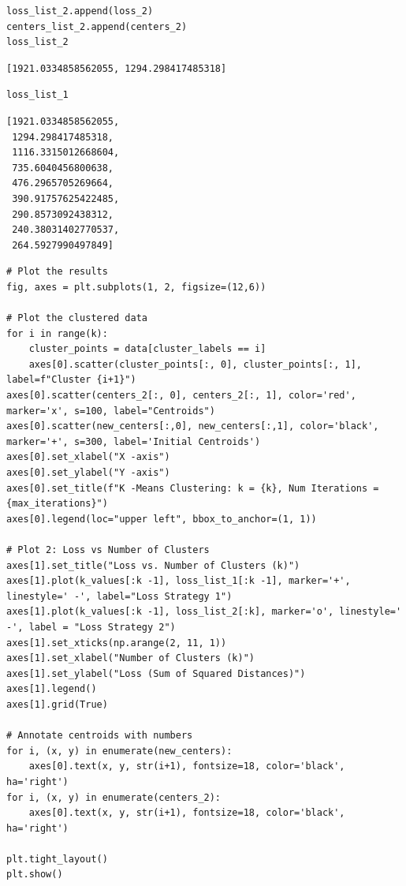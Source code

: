 \begin{verbatim}
loss_list_2.append(loss_2)
centers_list_2.append(centers_2)
loss_list_2
\end{verbatim}

\begin{verbatim}
[1921.0334858562055, 1294.298417485318]
\end{verbatim}

\begin{verbatim}
loss_list_1
\end{verbatim}

\begin{verbatim}
[1921.0334858562055,
 1294.298417485318,
 1116.3315012668604,
 735.6040456800638,
 476.2965705269664,
 390.91757625422485,
 290.8573092438312,
 240.38031402770537,
 264.5927990497849]
\end{verbatim}

\begin{verbatim}
# Plot the results
fig, axes = plt.subplots(1, 2, figsize=(12,6))

# Plot the clustered data
for i in range(k):
    cluster_points = data[cluster_labels == i]
    axes[0].scatter(cluster_points[:, 0], cluster_points[:, 1], label=f"Cluster {i+1}")
axes[0].scatter(centers_2[:, 0], centers_2[:, 1], color='red', marker='x', s=100, label="Centroids")
axes[0].scatter(new_centers[:,0], new_centers[:,1], color='black', marker='+', s=300, label='Initial Centroids')
axes[0].set_xlabel("X -axis")
axes[0].set_ylabel("Y -axis")
axes[0].set_title(f"K -Means Clustering: k = {k}, Num Iterations = {max_iterations}")
axes[0].legend(loc="upper left", bbox_to_anchor=(1, 1))

# Plot 2: Loss vs Number of Clusters
axes[1].set_title("Loss vs. Number of Clusters (k)")
axes[1].plot(k_values[:k -1], loss_list_1[:k -1], marker='+', linestyle=' -', label="Loss Strategy 1")
axes[1].plot(k_values[:k -1], loss_list_2[:k], marker='o', linestyle=' -', label = "Loss Strategy 2")
axes[1].set_xticks(np.arange(2, 11, 1))
axes[1].set_xlabel("Number of Clusters (k)")
axes[1].set_ylabel("Loss (Sum of Squared Distances)")
axes[1].legend()
axes[1].grid(True)

# Annotate centroids with numbers
for i, (x, y) in enumerate(new_centers):
    axes[0].text(x, y, str(i+1), fontsize=18, color='black', ha='right')
for i, (x, y) in enumerate(centers_2):
    axes[0].text(x, y, str(i+1), fontsize=18, color='black', ha='right')

plt.tight_layout()
plt.show()
\end{verbatim}

